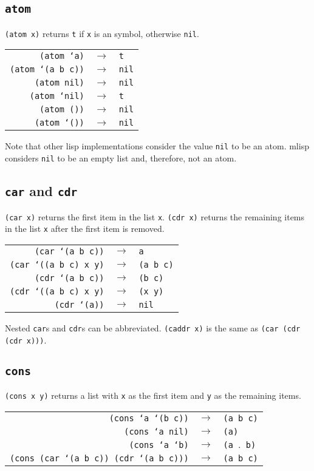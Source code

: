 \documentclass[12pt]{article}
\begin{document}
\subsection*{\texttt{atom}}
\texttt{(atom x)} returns \texttt{t} if \texttt{x} is an symbol, otherwise \texttt{nil}.
\begin{center}
\begin{tabular}{rcl}
\texttt{(atom `a)} & $\to$ & \texttt{t} \\
\texttt{(atom `(a b c))} & $\to$ & \texttt{nil} \\
\texttt{(atom nil)} & $\to$ & \texttt{nil} \\
\texttt{(atom `nil)} & $\to$ & \texttt{t} \\
\texttt{(atom ())} & $\to$ & \texttt{nil} \\
\texttt{(atom `())} & $\to$ & \texttt{nil}
\end{tabular}
\end{center}
Note that other lisp implementations consider the value \texttt{nil} to be an atom.
mlisp considers \texttt{nil} to be an empty list and, therefore, not an atom.
\subsection*{\texttt{car} and \texttt{cdr}}
\texttt{(car x)} returns the first item in the list \texttt{x}.
\texttt{(cdr x)} returns the remaining items in the list \texttt{x} after the first item is removed.
\begin{center}
\begin{tabular}{rcl}
\texttt{(car `(a b c))} & $\to$ & \texttt{a} \\
\texttt{(car `((a b c) x y)} & $\to$ & \texttt{(a b c)} \\
\texttt{(cdr `(a b c))} & $\to$ & \texttt{(b c)} \\
\texttt{(cdr `((a b c) x y)} & $\to$ & \texttt{(x y)} \\
\texttt{(cdr `(a))} & $\to$ & \texttt{nil}
\end{tabular}
\end{center}
Nested \texttt{car}s and \texttt{cdr}s can be abbreviated. \texttt{(caddr x)} is the same as \texttt{(car (cdr (cdr x)))}.
\subsection*{\texttt{cons}}
\texttt{(cons x y)} returns a list with \texttt{x} as the first item and \texttt{y} as the remaining items.
\begin{center}
\begin{tabular}{rcl}
\texttt{(cons `a `(b c))} & $\to$ & \texttt{(a b c)} \\
\texttt{(cons `a nil)} & $\to$ & \texttt{(a)} \\
\texttt{(cons `a `b)} & $\to$ & \texttt{(a $.$ b)} \\
\texttt{(cons (car `(a b c)) (cdr `(a b c)))} & $\to$ & \texttt{(a b c)}
\end{tabular}
\end{center}
\end{document}
